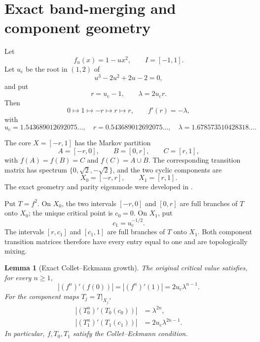 \documentclass[11pt]{article}
\newtheorem{lemma}[theorem]{Lemma}
\theoremstyle{definition}
\theoremstyle{remark}
\newcommand{\uc}{u_{\mathrm c}}
\begin{document}
\section{Exact band-merging and component geometry}
\label{sec:geometry}

Let
\begin{equation}\label{eq:family}
 f_u(x)=1-u x^2,
 \qquad I=[-1,1].
\end{equation}
Let $\uc$ be the root in $(1,2)$ of
\begin{equation}\label{eq:parameter}
 u^3-2u^2+2u-2=0,
\end{equation}
and put
\begin{equation}\label{eq:constants}
 r=\uc-1,
 \qquad
 \lambda=2\uc r.
\end{equation}
Then
\begin{equation}\label{eq:critical-orbit}
 0\longmapsto1\longmapsto-r\longmapsto r\longmapsto r,
 \qquad f'(r)=-\lambda,
\end{equation}
with
\begin{equation}\label{eq:numerical-constants}
 \uc=1.543689012692075\ldots,
 \quad r=0.543689012692075\ldots,
 \quad \lambda=1.678573510428318\ldots.
\end{equation}

The core $X=[-r,1]$ has the Markov partition
\begin{equation}\label{eq:partition}
 A=[-r,0],\qquad B=[0,r],\qquad C=[r,1],
\end{equation}
with $f(A)=f(B)=C$ and $f(C)=A\cup B$.  The corresponding transition matrix
has spectrum $\{0,\sqrt2,-\sqrt2\}$, and the two cyclic components are
\begin{equation}\label{eq:components}
 X_0=[-r,r],
 \qquad
 X_1=[r,1].
\end{equation}
The exact geometry and parity eigenmode were developed in
\citet{WangParity2026}.

Put $T=f^2$.  On $X_0$, the two intervals $[-r,0]$ and $[0,r]$ are full
branches of $T$ onto $X_0$; the unique critical point is $c_0=0$.  On $X_1$,
put
\begin{equation}\label{eq:high-critical}
 c_1=\uc^{-1/2}.
\end{equation}
The intervals $[r,c_1]$ and $[c_1,1]$ are full branches of $T$ onto $X_1$.
Both component transition matrices therefore have every entry equal to one
and are topologically mixing.

\begin{lemma}[Exact Collet--Eckmann growth]
\label{lem:exact-ce}
The original critical value satisfies, for every $n\ge1$,
\begin{equation}\label{eq:f-ce}
 |(f^n)'(f(0))|
 =|(f^n)'(1)|
 =2\uc\lambda^{n-1}.
\end{equation}
For the component maps $T_j=T|_{X_j}$,
\begin{align}
 |(T_0^n)'(T_0(c_0))|
 &=\lambda^{2n},\label{eq:central-ce}\\
 |(T_1^n)'(T_1(c_1))|
 &=2\uc\lambda^{2n-1}.
 \label{eq:high-ce}
\end{align}
In particular, $f,T_0,T_1$ satisfy the Collet--Eckmann condition.
\end{lemma}
\end{document}
